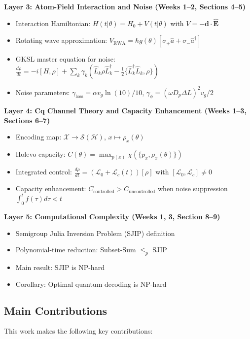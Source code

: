 \documentclass[12pt,a4paper]{article}
\newcommand{\cH}{\mathcal{H}}
\newcommand{\cL}{\mathcal{L}}
\newcommand{\cS}{\mathcal{S}}
\newcommand{\cX}{\mathcal{X}}
\begin{document}
\textbf{Layer 3: Atom-Field Interaction and Noise (Weeks 1--2, Sections 4--5)}
\begin{itemize}
\item Interaction Hamiltonian: $H(t|\theta) = H_0 + V(t|\theta)$ with $V = -\mathbf{d} \cdot \hat{\mathbf{E}}$
\item Rotating wave approximation: $V_{\text{RWA}} = \hbar g(\theta)[\sigma_+ \hat{a} + \sigma_- \hat{a}^\dagger]$
\item GKSL master equation for noise: $\frac{d\rho}{dt} = -i[H,\rho] + \sum_k \gamma_k(\hat{L}_k \rho \hat{L}_k^\dagger - \frac{1}{2}\{\hat{L}_k^\dagger \hat{L}_k, \rho\})$
\item Noise parameters: $\gamma_{\text{loss}} = \alpha v_g \ln(10)/10$, $\gamma_\phi = (\omega D_p \Delta L)^2 v_g/2$
\end{itemize}

\textbf{Layer 4: Cq Channel Theory and Capacity Enhancement (Weeks 1--3, Sections 6--7)}
\begin{itemize}
\item Encoding map: $\cX \to \cS(\cH)$, $x \mapsto \rho_x(\theta)$
\item Holevo capacity: $C(\theta) = \max_{p(x)} \chi(\{p_x, \rho_x(\theta)\})$
\item Integrated control: $\frac{d\rho}{dt} = (\cL_0 + \cL_c(t))[\rho]$ with $[\cL_0, \cL_c] \neq 0$
\item Capacity enhancement: $C_{\text{controlled}} > C_{\text{uncontrolled}}$ when noise suppression $\int_0^t f(\tau)d\tau < t$
\end{itemize}

\textbf{Layer 5: Computational Complexity (Weeks 1, 3, Section 8--9)}
\begin{itemize}
\item Semigroup Julia Inversion Problem (SJIP) definition
\item Polynomial-time reduction: Subset-Sum $\leq_p$ SJIP
\item Main result: SJIP is NP-hard
\item Corollary: Optimal quantum decoding is NP-hard
\end{itemize}

\subsection{Main Contributions}

This work makes the following key contributions:
\end{document}
